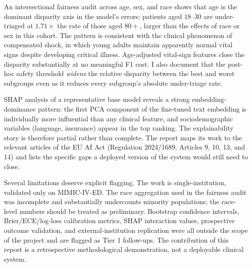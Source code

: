 An intersectional fairness audit across age, sex, and race shows that age is the dominant disparity axis in the model's errors: patients aged $18$--$30$ are under-triaged at $1.71\times$ the rate of those aged $80+$, larger than the effects of race or sex in this cohort. The pattern is consistent with the clinical phenomenon of compensated shock, in which young adults maintain apparently normal vital signs despite developing critical illness. Age-adjusted vital-sign features close the disparity substantially at no meaningful F1 cost. I also document that the post-hoc safety threshold \emph{widens} the relative disparity between the best and worst subgroups even as it reduces every subgroup's absolute under-triage rate.

SHAP analysis of a representative base model reveals a strong embedding-dominance pattern: the first PCA component of the fine-tuned text embedding is individually more influential than any clinical feature, and sociodemographic variables (language, insurance) appear in the top ranking. The explainability story is therefore partial rather than complete. The report maps its work to the relevant articles of the EU AI Act (Regulation 2024/1689, Articles 9, 10, 13, and 14) and lists the specific gaps a deployed version of the system would still need to close.

Several limitations deserve explicit flagging. The work is single-institution, validated only on MIMIC-IV-ED. The race aggregation used in the fairness audit was incomplete and substantially undercounts minority populations; the race-level numbers should be treated as preliminary. Bootstrap confidence intervals, Brier/ECE/log-loss calibration metrics, SHAP interaction values, prospective outcome validation, and external-institution replication were all outside the scope of the project and are flagged as Tier 1 follow-ups. The contribution of this report is a retrospective methodological demonstration, not a deployable clinical system.
